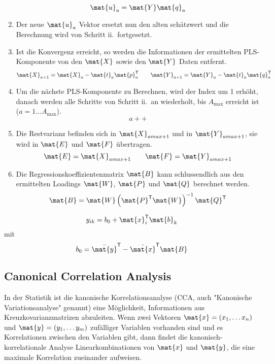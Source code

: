 \begin{enumerate}
        $$\mat{u}_a = \mat{Y} \mat{q}_a$$
    \item Der neue $\mat{u}_a$ Vektor ersetzt nun den alten schätzwert und die Berechnung wird von Schritt ii.\ fortgesetzt.
    \item Ist die Konvergenz erreicht, so werden die Informationen der ermittelten \gls{PLS}-Komponente von den $\mat{X}$ sowie den $\mat{Y}$ Daten entfernt.
        $$\mat{X}_{a+1} = \mat{X}_a - \mat{t}_a \mat{p}_a^\mathsf{T} \qquad \mat{Y}_{a+1} = \mat{Y}_a - \mat{t}_a \mat{q}_a^\mathsf{T}$$
    \item Um die nächste PLS-Komponente zu Berechnen, wird der Index um 1 erhöht, danach werden alle Schritte von Schritt ii.\ an wiederholt, bis $A_\mathrm{max}$ erreicht ist ($a = 1 \ldots A_\mathrm{max}$).
        $$a++$$
    \item Die Restvarianz befinden sich in $\mat{X}_{amax+1}$ und in $\mat{Y}_{amax+1}$, sie wird in $\mat{E}$ und $\mat{F}$ übertragen.
        $$\mat{E} = \mat{X}_{amax+1} \qquad \mat{F} = \mat{Y}_{amax+1}$$
    \item Die Regressionskoeffizientenmatrix $\mat{B}$ kann schlussendlich aus den ermittelten Loadings $\mat{W}$, $\mat{P}$ und $\mat{Q}$ berechnet werden.
        \begin{equation}
            \mat{B} = \mat{W}\left(\mat{P}^\mathsf{T} \mat{W}\right)^{-1} \mat{Q}^\mathsf{T}
        \end{equation}
\end{enumerate}
\begin{equation}
    y_{ik} = b_0 + \mat{x}_i^\mathsf{T} \mat{b}_k
\end{equation}
mit 
\begin{equation}
    b_0 = \bar{\mat{y}}^\mathsf{T} - \bar{\mat{x}}^\mathsf{T} \mat{B}
\end{equation}

\subsection{Canonical Correlation Analysis}

In der Statistik ist die kanonische Korrelationsanalyse (\gls{CCA}, auch "Kanonische Variationsanalyse" genannt) eine Möglichkeit, Informationen aus Kreuzkovarianzmatrizen abzuleiten.
Wenn zwei Vektoren $\mat{x} = (x_1, \ldots x_n)$ und $\mat{y} = (y_1, \ldots y_m)$ zufälliger Variablen vorhanden sind und es Korrelationen zwischen den Variablen gibt, dann findet die kanonisch-korrelationale Analyse Linearkombinationen von $\mat{x}$ und $\mat{y}$, die eine maximale Korrelation zueinander aufweisen.

